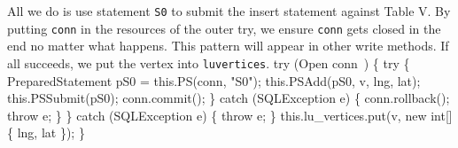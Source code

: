 \nwdocspar
{\small All we do is use statement {\tt{}\protect{}S0} to submit the insert statement
against Table V. By putting {\tt{}conn} in the resources of the outer try, we
ensure {\tt{}conn} gets closed in the end no matter what happens. This pattern
will appear in other write methods. If all succeeds, we put the vertex into
{\tt{}lu{}vertices}.}
\nwenddocs{}\plusendmoddef
  try (\LA{}Open \code{}conn\edoc{}~{\nwtagstyle{}}\RA{}) \{
    try \{
      PreparedStatement pS0 = this.PS(conn, "S0");
      this.PSAdd(pS0, v, lng, lat);
      this.PSSubmit(pS0);
      conn.commit();
    \} catch (SQLException e) \{
      conn.rollback();
      throw e;
    \}
  \} catch (SQLException e) \{
    throw e;
  \}
  this.lu_vertices.put(v, new int[] \{ lng, lat \});
\}
\nwendcode{}\nwdocspar

